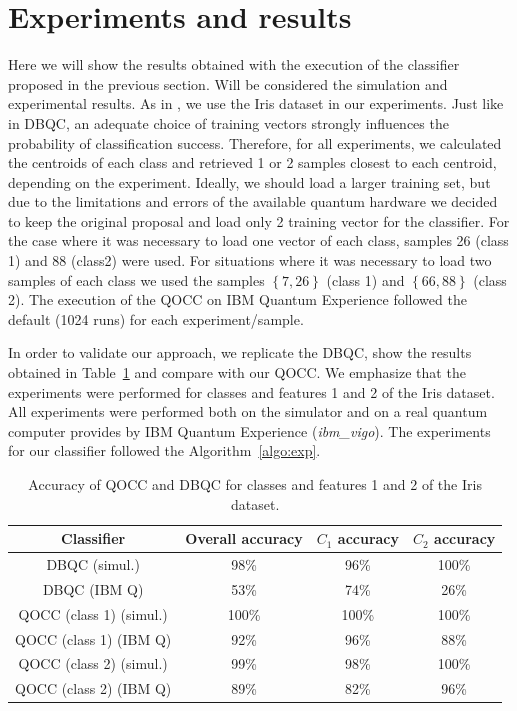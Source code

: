 \documentclass{esannV2}
\begin{document}
\section{Experiments and results}

Here we will show the results obtained with the execution of the classifier proposed in the previous section. Will be considered the simulation and experimental results. As in \cite{schuld2017implementing}, we use the Iris dataset \cite{fisher1936use} in our experiments. Just like in DBQC, an adequate choice of training vectors strongly influences the probability of classification success. Therefore, for all experiments, we calculated the centroids of each class and retrieved 1 or 2 samples closest to each centroid, depending on the experiment. Ideally, we should load a larger training set, but due to the limitations and errors of the available quantum hardware we decided to keep the original proposal and load only 2 training vector for the classifier. For the case where it was necessary to load one vector of each class, samples 26 (class 1) and 88 (class2) were used. For situations where it was necessary to load two samples of each class we used the samples $\left \{ 7, 26 \right \}$ (class 1) and $\left \{ 66, 88 \right \}$ (class 2). The execution of the QOCC on IBM Quantum Experience\cite{ibmq} followed the default (1024 runs) for each experiment/sample. 

In order to validate our approach, we replicate the DBQC, show the results obtained in Table~\ref{tab:results1} and compare with our QOCC. We emphasize that the experiments were performed for classes and features 1 and 2 of the Iris dataset. All experiments were performed both on the simulator and on a real quantum computer provides by IBM Quantum Experience (\textit{ibm\_vigo}). The experiments for our classifier followed the Algorithm~\ref{algo:exp}.

\begin{table}[ht]
  \centering
  \begin{tabular}{|c|c|c|c|}
    \hline
    Classifier & Overall accuracy & $C_{1}$ accuracy & $C_{2}$ accuracy \\
    \hline
    DBQC (simul.) & 98\% & 96\% & 100\% \\
    DBQC (IBM Q) & 53\% & 74\% & 26\% \\
    QOCC (class 1) (simul.) & 100\% & 100\% & 100\% \\
    QOCC (class 1) (IBM Q) & 92\% & 96\% & 88\% \\
    QOCC (class 2) (simul.) & 99\% & 98\% & 100\% \\
    QOCC (class 2) (IBM Q) & 89\% & 82\% & 96\% \\
    \hline
  \end{tabular}
  \caption{Accuracy of QOCC and DBQC for classes and features 1 and 2 of the Iris dataset.}\label{tab:results1}
\end{table}
\end{document}
